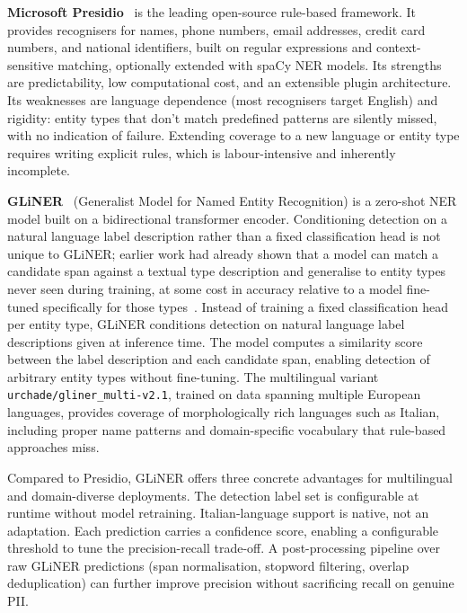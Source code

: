 \textbf{Microsoft Presidio}~\cite{microsoft2018presidio} is the leading open-source rule-based framework. It provides recognisers for names, phone numbers, email addresses, credit card numbers, and national identifiers, built on regular expressions and context-sensitive matching, optionally extended with spaCy NER models. Its strengths are predictability, low computational cost, and an extensible plugin architecture. Its weaknesses are language dependence (most recognisers target English) and rigidity: entity types that don't match predefined patterns are silently missed, with no indication of failure. Extending coverage to a new language or entity type requires writing explicit rules, which is labour-intensive and inherently incomplete.

\textbf{GLiNER}~\cite{zaratiana2023gliner} (Generalist Model for Named Entity Recognition) is a zero-shot NER model built on a bidirectional transformer encoder. Conditioning detection on a natural language label description rather than a fixed classification head is not unique to GLiNER; earlier work had already shown that a model can match a candidate span against a textual type description and generalise to entity types never seen during training, at some cost in accuracy relative to a model fine-tuned specifically for those types~\cite{aly2021zeroshot}. Instead of training a fixed classification head per entity type, GLiNER conditions detection on natural language label descriptions given at inference time. The model computes a similarity score between the label description and each candidate span, enabling detection of arbitrary entity types without fine-tuning. The multilingual variant \texttt{urchade/gliner\_multi-v2.1}, trained on data spanning multiple European languages, provides coverage of morphologically rich languages such as Italian, including proper name patterns and domain-specific vocabulary that rule-based approaches miss.

Compared to Presidio, GLiNER offers three concrete advantages for multilingual and domain-diverse deployments. The detection label set is configurable at runtime without model retraining. Italian-language support is native, not an adaptation. Each prediction carries a confidence score, enabling a configurable threshold to tune the precision-recall trade-off. A post-processing pipeline over raw GLiNER predictions (span normalisation, stopword filtering, overlap deduplication) can further improve precision without sacrificing recall on genuine PII.

